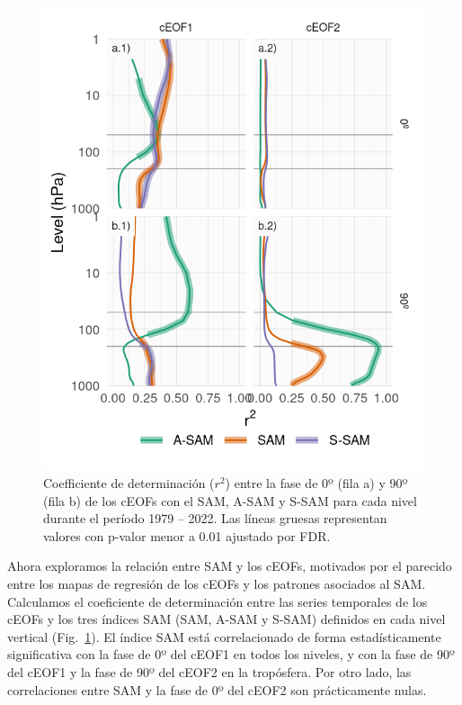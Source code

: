 \documentclass[12pt,oneside]{reedthesis}
\begin{document}
\begin{figure}
\includegraphics{figures/40-sam-ceof/sam-eof-vertical-1} \caption{Coefficiente de determinación (\(r^2\)) entre la fase de 0º (fila a) y 90º (fila b) de los cEOFs con el SAM, A-SAM y S-SAM para cada nivel durante el período 1979 -- 2022.
Las líneas gruesas representan valores con p-valor menor a 0.01 ajustado por FDR.}\label{fig:sam-eof-vertical}
\end{figure}

Ahora exploramos la relación entre SAM y los cEOFs, motivados por el parecido entre los mapas de regresión de los cEOFs y los patrones asociados al SAM.
Calculamos el coeficiente de determinación entre las series temporales de los cEOFs y los tres índices SAM (SAM, A-SAM y S-SAM) definidos en cada nivel vertical (Fig.~\ref{fig:sam-eof-vertical}).
El índice SAM está correlacionado de forma estadísticamente significativa con la fase de 0º del cEOF1 en todos los niveles, y con la fase de 90º del cEOF1 y la fase de 90º del cEOF2 en la tropósfera.
Por otro lado, las correlaciones entre SAM y la fase de 0º del cEOF2 son prácticamente nulas.
\end{document}
